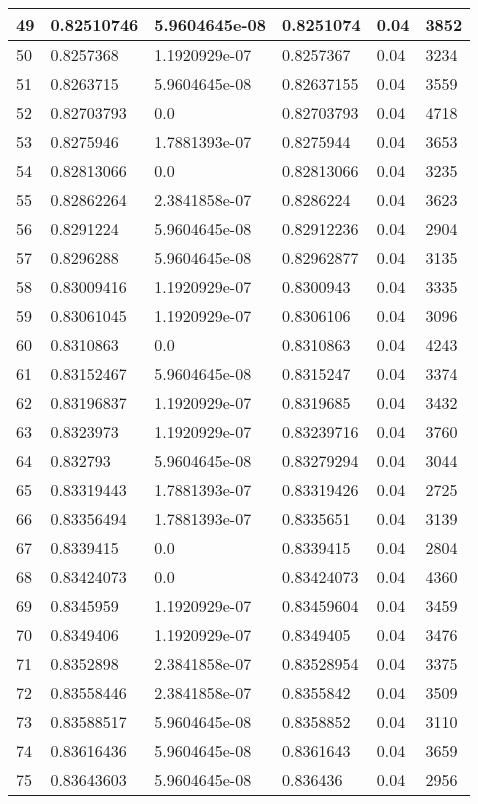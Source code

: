 \begin{longtable}{|l|l|l|l|l|l|}
49 & 0.82510746 & 5.9604645e-08 & 0.8251074 & 0.04 & 3852 \\ \hline 
50 & 0.8257368 & 1.1920929e-07 & 0.8257367 & 0.04 & 3234 \\ \hline 
51 & 0.8263715 & 5.9604645e-08 & 0.82637155 & 0.04 & 3559 \\ \hline 
52 & 0.82703793 & 0.0 & 0.82703793 & 0.04 & 4718 \\ \hline 
53 & 0.8275946 & 1.7881393e-07 & 0.8275944 & 0.04 & 3653 \\ \hline 
54 & 0.82813066 & 0.0 & 0.82813066 & 0.04 & 3235 \\ \hline 
55 & 0.82862264 & 2.3841858e-07 & 0.8286224 & 0.04 & 3623 \\ \hline 
56 & 0.8291224 & 5.9604645e-08 & 0.82912236 & 0.04 & 2904 \\ \hline 
57 & 0.8296288 & 5.9604645e-08 & 0.82962877 & 0.04 & 3135 \\ \hline 
58 & 0.83009416 & 1.1920929e-07 & 0.8300943 & 0.04 & 3335 \\ \hline 
59 & 0.83061045 & 1.1920929e-07 & 0.8306106 & 0.04 & 3096 \\ \hline 
60 & 0.8310863 & 0.0 & 0.8310863 & 0.04 & 4243 \\ \hline 
61 & 0.83152467 & 5.9604645e-08 & 0.8315247 & 0.04 & 3374 \\ \hline 
62 & 0.83196837 & 1.1920929e-07 & 0.8319685 & 0.04 & 3432 \\ \hline 
63 & 0.8323973 & 1.1920929e-07 & 0.83239716 & 0.04 & 3760 \\ \hline 
64 & 0.832793 & 5.9604645e-08 & 0.83279294 & 0.04 & 3044 \\ \hline 
65 & 0.83319443 & 1.7881393e-07 & 0.83319426 & 0.04 & 2725 \\ \hline 
66 & 0.83356494 & 1.7881393e-07 & 0.8335651 & 0.04 & 3139 \\ \hline 
67 & 0.8339415 & 0.0 & 0.8339415 & 0.04 & 2804 \\ \hline 
68 & 0.83424073 & 0.0 & 0.83424073 & 0.04 & 4360 \\ \hline 
69 & 0.8345959 & 1.1920929e-07 & 0.83459604 & 0.04 & 3459 \\ \hline 
70 & 0.8349406 & 1.1920929e-07 & 0.8349405 & 0.04 & 3476 \\ \hline 
71 & 0.8352898 & 2.3841858e-07 & 0.83528954 & 0.04 & 3375 \\ \hline 
72 & 0.83558446 & 2.3841858e-07 & 0.8355842 & 0.04 & 3509 \\ \hline 
73 & 0.83588517 & 5.9604645e-08 & 0.8358852 & 0.04 & 3110 \\ \hline 
74 & 0.83616436 & 5.9604645e-08 & 0.8361643 & 0.04 & 3659 \\ \hline 
75 & 0.83643603 & 5.9604645e-08 & 0.836436 & 0.04 & 2956 \\ \hline 
\end{longtable}